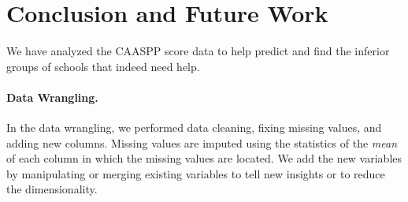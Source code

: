 \documentclass[11pt]{article}
\begin{document}
%
%

\section{Conclusion and Future Work}

We have analyzed the CAASPP score data 
to help predict and find the inferior groups of schools that indeed need help.

\paragraph*{Data Wrangling.} In the data wrangling,
we performed data cleaning, fixing missing values, and adding new columns.
%
Missing values are imputed using the statistics of the \textit{mean} of each column in which the missing values are located.
%
We add the new variables by manipulating or merging existing variables to tell new insights or to reduce the dimensionality.
\end{document}
